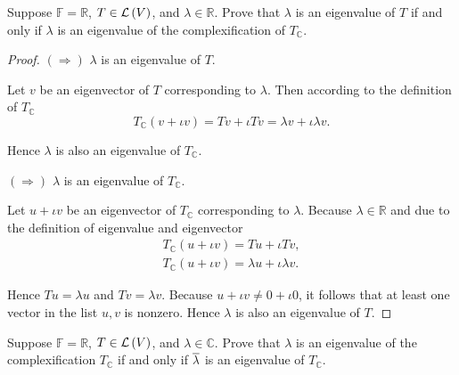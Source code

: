 \begin{exercise}
    Suppose $\mathbb{F} = \mathbb{R}$, $T\in\mathcal{L}\left({V}\right)$, and $\lambda\in\mathbb{R}$. Prove that $\lambda$ is an eigenvalue of $T$ if and only if $\lambda$ is an eigenvalue of the complexification of $T_{\mathbb{C}}$.
\end{exercise}

\begin{proof}
    $(\Rightarrow)$ $\lambda$ is an eigenvalue of $T$.

    Let $v$ be an eigenvector of $T$ corresponding to $\lambda$. Then according to the definition of $T_{\mathbb{C}}$
    \[
        T_{\mathbb{C}}(v + \iota v) = Tv + \iota Tv = \lambda v + \iota \lambda v.
    \]

    Hence $\lambda$ is also an eigenvalue of $T_{\mathbb{C}}$.

    $(\Rightarrow)$ $\lambda$ is an eigenvalue of $T_{\mathbb{C}}$.

    Let $u + \iota v$ be an eigenvector of $T_{\mathbb{C}}$ corresponding to $\lambda$. Because $\lambda\in\mathbb{R}$ and due to the definition of eigenvalue and eigenvector
    \[
        \begin{split}
            T_{\mathbb{C}}(u + \iota v) = Tu + \iota Tv, \\
            T_{\mathbb{C}}(u + \iota v) = \lambda u + \iota \lambda v.
        \end{split}
    \]

    Hence $Tu = \lambda u$ and $Tv = \lambda v$. Because $u + \iota v\ne 0 + \iota 0$, it follows that at least one vector in the list $u, v$ is nonzero. Hence $\lambda$ is also an eigenvalue of $T$.
\end{proof}
\newpage

\begin{exercise}
    Suppose $\mathbb{F} = \mathbb{R}$, $T\in\mathcal{L}\left({V}\right)$, and $\lambda\in\mathbb{C}$. Prove that $\lambda$ is an eigenvalue of the complexification $T_{\mathbb{C}}$ if and only if $\overline{\lambda}$ is an eigenvalue of $T_{\mathbb{C}}$.
\end{exercise}

